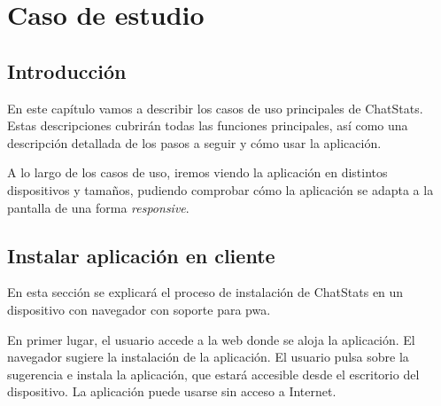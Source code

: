 \chapter{Caso de estudio}
\label{chap:case-study}

\section{Introducción}
\label{sec:5:introduction}

En este capítulo vamos a describir los casos de uso principales de ChatStats. Estas descripciones cubrirán todas las funciones principales, así como una descripción detallada de los pasos a seguir y cómo usar la aplicación.

A lo largo de los casos de uso, iremos viendo la aplicación en distintos dispositivos y tamaños, pudiendo comprobar cómo la aplicación se adapta a la pantalla de una forma \textit{responsive}.

\section{Instalar aplicación en cliente}

En esta sección se explicará el proceso de instalación de ChatStats en un dispositivo con navegador con soporte para \acrfull{pwa}.

En primer lugar, el usuario accede a la web donde se aloja la aplicación. El navegador sugiere la instalación de la aplicación. El usuario pulsa sobre la sugerencia e instala la aplicación, que estará accesible desde el escritorio del dispositivo. La aplicación puede usarse sin acceso a Internet.


